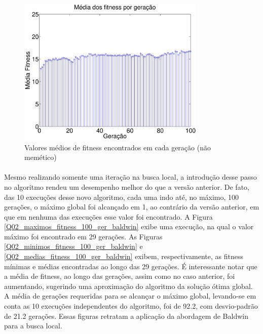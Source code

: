 \documentclass{report}
\begin{document}
\begin{figure}[H]
	\centering
	\includegraphics[width = 0.8\textwidth]{Q02_medias_fitness_100_ger_nao_memetico.eps}
	\caption{Valores médios de fitness encontrados em cada geração (não memético)}	
	\label{Q02_medias_fitness_100_ger_nao_memetico}
\end{figure}   

\paragraph{} Mesmo realizando somente uma iteração na busca local, a introdução desse passo no algoritmo rendeu um desempenho melhor do que a versão anterior. De fato, das 10 execuções desse novo algoritmo, cada uma indo até, no máximo, 100 gerações, o máximo global foi alcançado em 1, ao contrário da versão anterior, em que em nenhuma das execuções esse valor foi encontrado. A Figura \ref{Q02_maximos_fitness_100_ger_baldwin} exibe uma execução, na qual o valor máximo foi encontrado em 29 gerações. As Figuras \ref{Q02_minimos_fitness_100_ger_baldwin} e \ref{Q02_medias_fitness_100_ger_baldwin} exibem, respectivamente, as fitness mínimas e médias encontradas ao longo das 29 gerações. É interessante notar que a média de fitness, ao longo das gerações, assim como no caso anterior, foi aumentando, sugerindo uma aproximação do algoritmo da solução ótima global. A média de gerações requeridas para se alcançar o máximo global, levando-se em conta as 10 execuções independentes do algoritmo, foi de 92.2, com desvio-padrão de 21.2 gerações. Essas figuras retratam a aplicação da abordagem de Baldwin para a busca local.\\
\end{document}
